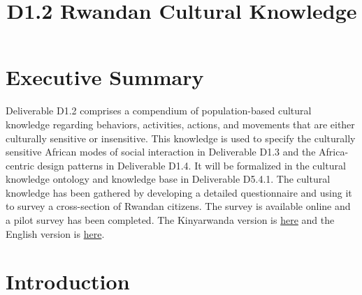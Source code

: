 \documentclass{CSSRforAfrica}
\begin{document}



\title{D1.2 Rwandan Cultural Knowledge}   

\partner{}                               




\maketitle
 

\section*{Executive Summary}
\label{executive_summary}
 
Deliverable D1.2  comprises a compendium of population-based cultural knowledge regarding behaviors, activities, actions, and movements that are either culturally sensitive or  insensitive. This knowledge is used to specify the culturally sensitive African modes of social interaction in Deliverable D1.3 and the Africa-centric design patterns in Deliverable D1.4. It will be formalized in the cultural knowledge ontology and knowledge base in Deliverable D5.4.1.  The cultural knowledge has been gathered by developing a detailed questionnaire and using it  to survey a cross-section of Rwandan citizens.
The survey  is available online and a pilot survey has been completed. The Kinyarwanda version is   \href{https://docs.google.com/forms/d/e/1FAIpQLScSu95pCT2MsRohukI9ib6GxsuyXuQozeqGQXO9DYcDD5RvlQ/viewform}{here} and the English version is   \href{https://docs.google.com/forms/d/e/1FAIpQLSc-5lz0YfPCtK5BSL6cGkmlJVkE0vwyKXppkhXs4l1rYPwKlA/viewform}{here}.  

\clearpage

 
\pagebreak
\tableofcontents
\newpage


\section{Introduction}
 \label{section:introduction}
\end{document}
